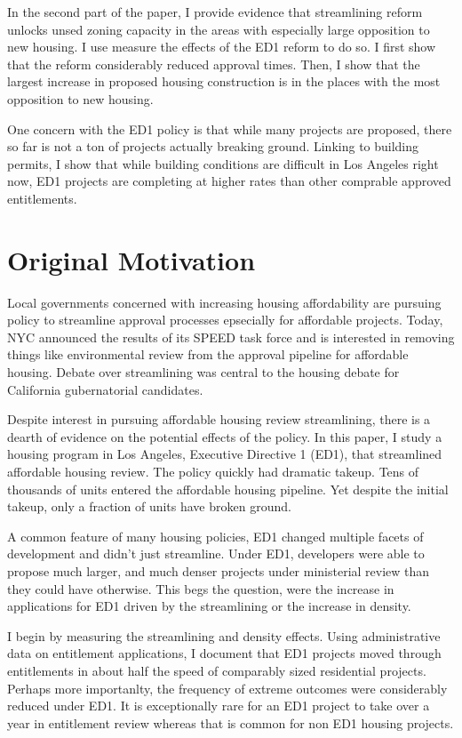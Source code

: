 \documentclass[12pt]{article}
\theoremstyle{definition}
\begin{document}
In the second part of the paper, I provide evidence that streamlining reform unlocks unsed zoning capacity in the areas with especially large opposition to new housing. I use measure the effects of the ED1 reform to do so. I first show that the reform considerably reduced approval times. Then, I show that the largest increase in proposed housing construction is in the places with the most opposition to new housing. 

One concern with the ED1 policy is that while many projects are proposed, there so far is not a ton of projects actually breaking ground. Linking to building permits, I show that while building conditions are difficult in Los Angeles right now, ED1 projects are completing at higher rates than other comprable approved entitlements. 

\section{Original Motivation}


Local governments concerned with increasing housing affordability are pursuing policy to streamline approval processes epsecially for affordable projects. Today, NYC announced the results of its SPEED task force and is interested in removing things like environmental review from the approval pipeline for affordable housing. Debate over streamlining was central to the housing debate for California gubernatorial candidates. 

Despite interest in pursuing affordable housing review streamlining, there is a dearth of evidence on the potential effects of the policy. In this paper, I study a housing program in Los Angeles, Executive Directive 1 (ED1), that streamlined affordable housing review. The policy quickly had dramatic takeup. Tens of thousands of units entered the affordable housing pipeline. Yet despite the initial takeup, only a fraction of units have broken ground. 

A common feature of many housing policies, ED1 changed multiple facets of development and didn't just streamline. Under ED1, developers were able to propose much larger, and much denser projects under ministerial review than they could have otherwise. This begs the question, were the increase in applications for ED1 driven by the streamlining or the increase in density. 

I begin by measuring the streamlining and density effects. Using administrative data on entitlement applications, I document that ED1 projects moved through entitlements in about half the speed of comparably sized residential projects. Perhaps more importanlty, the frequency of extreme outcomes were considerably reduced under ED1. It is exceptionally rare for an ED1 project to take over a year in entitlement review whereas that is common for non ED1 housing projects. 
\end{document}
